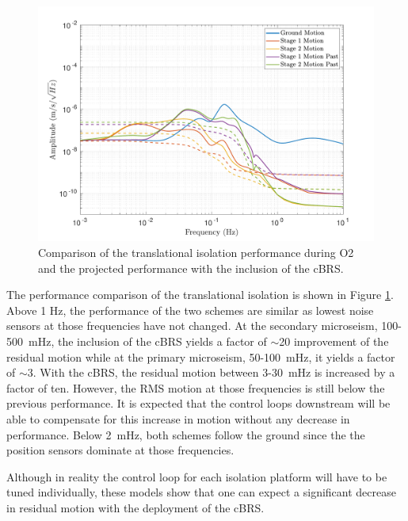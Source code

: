 \documentclass [12pt, proquest]{uwthesis}[2019]
\begin{document}
\begin{figure}[!h]
\begin{center}
\includegraphics[width=\textwidth]{cBRS_Model_CompX.pdf}
\caption[Comparison of the translational isolation performance during O2 and the projected performance with the inclusion of the cBRS]{Comparison of the translational isolation performance during O2 and the projected performance with the inclusion of the cBRS.}
\label{cBRSCompX}
\end{center}
\end{figure}

The performance comparison of the translational isolation is shown in Figure \ref{cBRSCompX}. Above 1 Hz, the performance of the two schemes are similar as lowest noise sensors at those frequencies have not changed. At the secondary microseism, 100-500~mHz, the inclusion of the cBRS yields a factor of $\sim$20 improvement of the residual motion while at the primary microseism, 50-100~mHz, it yields a factor of $\sim$3. With the cBRS, the residual motion between 3-30~mHz is increased by a factor of ten. However, the RMS motion at those frequencies is still below the previous performance. It is expected that the control loops downstream will be able to compensate for this increase in motion without any decrease in performance. Below 2~mHz, both schemes follow the ground since the the position sensors dominate at those frequencies.

Although in reality the control loop for each isolation platform will have to be tuned individually, these models show that one can expect a significant decrease in residual motion with the deployment of the cBRS. 
\end{document}
